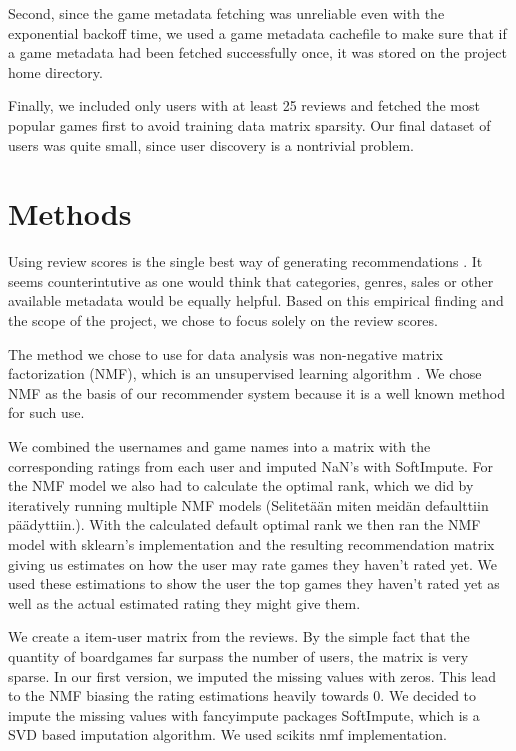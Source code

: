 \documentclass[a4paper,12pt,bibliography=totoc,numbers=noenddot,sfdefaults=false,abstract=true,notitlepage]{scrartcl} %
\begin{document}
	Second, since the game metadata fetching was unreliable even with the exponential backoff time, we used a game metadata cachefile to make sure that if a game metadata had been fetched successfully once, it was stored  on the project home directory.

	Finally, we included only users with at least 25 reviews and fetched the most popular games first to avoid training data matrix sparsity. Our final dataset of users was quite small, since user discovery is a nontrivial problem.
	
	
	\section{Methods}\label{methods}

	Using review scores is the single best way of generating recommendations \autocite{epsteinRangeWhyGeneralists2021}. It seems counterintutive as one would think that categories, genres, sales or other available metadata would be equally helpful. Based on this empirical finding and the scope of the project, we chose to focus solely on the review scores.

	The method we chose to use for data analysis was non-negative matrix factorization (NMF), which is an unsupervised learning algorithm \autocite{dalyStepbyStepNMFExample2023}. We chose NMF as the basis of our recommender system
    because it is a well known method for such use. %

	We combined the usernames and game names into a matrix with the corresponding ratings from each user and imputed NaN's with SoftImpute. For the NMF model we also had to calculate the optimal rank, which we did by iteratively running multiple NMF models (Selitetään miten meidän defaulttiin päädyttiin.). With the calculated default optimal rank we then ran the NMF model with sklearn's implementation and the resulting recommendation matrix giving us estimates on how the user may rate games they haven't rated yet. We used these estimations to show the user the top games they haven't rated yet as well as the actual estimated rating they might give them.

    We create a item-user matrix from the reviews. By the simple fact that the quantity of boardgames far surpass the number of users, the matrix is very sparse. In our
    first version, we imputed the missing values with zeros. This lead to the NMF biasing the rating estimations heavily towards 0. We decided to impute the missing values
    with fancyimpute packages SoftImpute, which is a SVD based imputation algorithm.%
    We used scikits nmf implementation.
\end{document}
